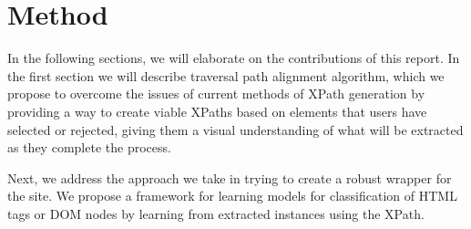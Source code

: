 \chapter{Method}
\label{chap:method}
In the following sections, we will elaborate on the contributions of this report.
In the first section we will describe traversal path alignment algorithm, which we
propose to overcome the issues of current methods of XPath generation by providing
a way to create viable XPaths based on elements that users have selected or rejected,
giving them a visual understanding of what will be extracted as they complete the process.

Next, we address the approach we take in trying to create a robust wrapper for the site.
We propose a framework for learning models for classification of HTML tags or DOM nodes by
learning from extracted instances using the XPath.



